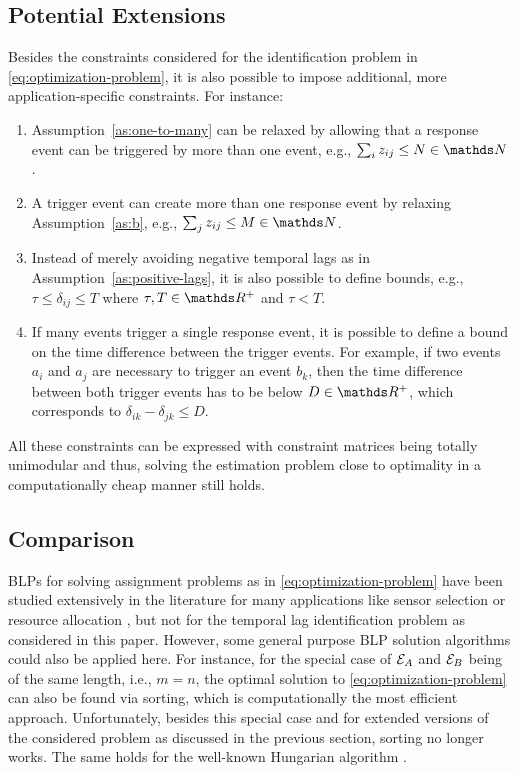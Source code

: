 \documentclass[journal, 10pt]{IEEEtran}
\begin{document}
\subsection{Potential Extensions}
\label{sec:lp_extensions}
%
Besides the constraints considered for the identification problem in \eqref{eq:optimization-problem}, it is also possible to impose additional, more application-specific constraints. For instance:

\begin{enumerate}
	\item Assumption~\ref{as:one-to-many} can be relaxed by allowing that a response event can be triggered by more than one event, e.g., $\textstyle\sum_i z_{ij} \le N \in \NewN$.
	\item A trigger event can create more than one response event by relaxing Assumption~\ref{as:b}, e.g., $\textstyle\sum_j z_{ij} \le M\in \NewN$.
	\item Instead of merely avoiding negative temporal lags as in Assumption~\ref{as:positive-lags}, it is also possible to define bounds, e.g., $\tau \le \delta_{ij} \le T$ where $\tau, T \in \NewR^+$ and $\tau < T$.
	\item If many events trigger a single response event, it is possible to define a bound on the time difference between the trigger events. For example, if two events $a_i$ and $a_j$ are necessary to trigger an event $b_k$, then the time difference between both trigger events has to be below $D \in \NewR^+$, which corresponds to $\delta_{ik}-\delta_{jk} \le D$.
\end{enumerate}

All these constraints can be expressed with constraint matrices being totally unimodular and thus, solving the estimation problem close to optimality in a computationally cheap manner still holds.


\subsection{Comparison}
\label{sec:lp_comparison}
%
BLPs for solving assignment problems as in \eqref{eq:optimization-problem} have been studied extensively in the literature for many applications like sensor selection \cite{Moon2017} or resource allocation \cite{Sultan2011}, but not for the temporal lag identification problem as considered in this paper. However, some general purpose BLP solution algorithms could also be applied here. For instance, for the special case of $\mathcal E_A$ and $\mathcal E_B$ being of the same length, i.e., $m=n$, the optimal solution to \eqref{eq:optimization-problem} can also be found via sorting, which is computationally the most efficient approach. Unfortunately, besides this special case and for extended versions of the considered problem as discussed in the previous section, sorting no longer works. The same holds for the well-known Hungarian algorithm \cite{Kuhn1955}.
\end{document}
